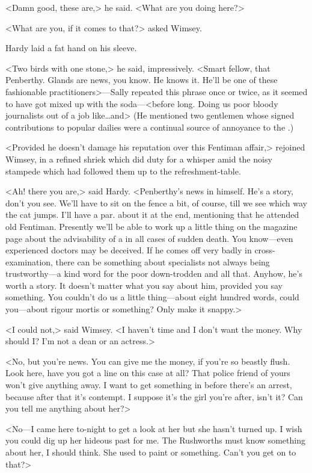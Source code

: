 <Damn good, these are,> he said. <What are you doing here?>

<What are you, if it comes to that?> asked Wimsey.

Hardy laid a fat hand on his sleeve.

<Two birds with one stone,> he said, impressively. <Smart fellow, that Penberthy. Glands are news, you know. He knows it. He'll be one of these fashionable practitioners>—Sally repeated this phrase once or twice, as it seemed to have got mixed up with the soda—<before long. Doing us poor bloody journalists out of a job like\dots  and\longdots> (He mentioned two gentlemen whose signed contributions to popular dailies were a continual source of annoyance to the .)

<Provided he doesn't damage his reputation over this Fentiman affair,> rejoined Wimsey, in a refined shriek which did duty for a whisper amid the noisy stampede which had followed them up to the refreshment-table.

<Ah! there you are,> said Hardy. <Penberthy's news in himself. He's a story, don't you see. We'll have to sit on the fence a bit, of course, till we see which way the cat jumps. I'll have a par. about it at the end, mentioning that he attended old Fentiman. Presently we'll be able to work up a little thing on the magazine page about the advisability of a  in all cases of sudden death. You know—even experienced doctors may be deceived. If he comes off very badly in cross-examination, there can be something about specialists not always being trustworthy—a kind word for the poor down-trodden  and all that. Anyhow, he's worth a story. It doesn't matter what you say about him, provided you say something. You couldn't do us a little thing—about eight hundred words, could you—about rigour mortis or something? Only make it snappy.>

<I could not,> said Wimsey. <I haven't time and I don't want the money. Why should I\@? I'm not a dean or an actress.>

<No, but you're news. You can give me the money, if you're so beastly flush. Look here, have you got a line on this case at all? That police friend of yours won't give anything away. I want to get something in before there's an arrest, because after that it's contempt. I suppose it's the girl you're after, isn't it? Can you tell me anything about her?>

<No—I came here to-night to get a look at her but she hasn't turned up. I wish you could dig up her hideous past for me. The Rushworths must know something about her, I should think. She used to paint or something. Can't you get on to that?>

